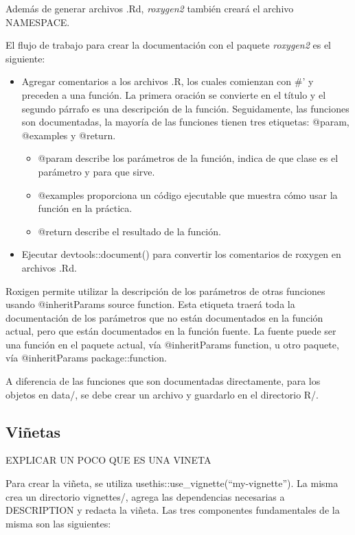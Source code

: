 Además de generar archivos .Rd, \emph{roxygen2} también creará el archivo NAMESPACE.

El flujo de trabajo para crear la documentación con el paquete \emph{roxygen2} es el siguiente:
\begin{itemize}
\item Agregar comentarios a los archivos .R, los cuales comienzan con \#' y preceden a una función. La primera oración se convierte en el título y el segundo párrafo es una descripción de la función. Seguidamente, las funciones son documentadas, la mayoría de las funciones tienen tres etiquetas: @param, @examples y @return.

\begin{itemize}
\item @param describe los parámetros de la función, indica de que clase es el parámetro y para que sirve.
\item @examples proporciona un código ejecutable que muestra cómo usar la función en la práctica. 
\item @return describe el resultado de la función. 
\end{itemize}
\end{itemize}
\begin{itemize}

\item Ejecutar devtools::document() para convertir los comentarios de roxygen en archivos .Rd. 

\end{itemize}

Roxigen permite utilizar la descripción de los parámetros de otras funciones usando @inheritParams source function. Esta etiqueta traerá toda la documentación de los parámetros que no están documentados en la función actual, pero que están documentados en la función fuente. La fuente puede ser una función en el paquete actual, vía @inheritParams function, u otro paquete, vía @inheritParams package::function.

A diferencia de las funciones que son documentadas directamente, para los objetos en data/, se debe crear un archivo y guardarlo en el directorio R/.



\subsection{Viñetas}

EXPLICAR UN POCO QUE ES UNA VINETA


Para crear la viñeta, se utiliza usethis::use\_vignette(``my-vignette''). La misma crea un directorio vignettes/, agrega las dependencias necesarias a DESCRIPTION y redacta la viñeta. Las tres componentes fundamentales de la misma son las siguientes:

